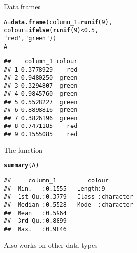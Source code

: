 \documentclass[aspectratio=169]{beamer}\usepackage[]{graphicx}\usepackage[]{xcolor}
\makeatletter
\newcommand{\hlnum}[1]{\textcolor[rgb]{0.686,0.059,0.569}{#1}}%
\newcommand{\hlsng}[1]{\textcolor[rgb]{0.192,0.494,0.8}{#1}}%
\newcommand{\hlopt}[1]{\textcolor[rgb]{0,0,0}{#1}}%
\newcommand{\hldef}[1]{\textcolor[rgb]{0.345,0.345,0.345}{#1}}%
\newcommand{\hlkwb}[1]{\textcolor[rgb]{0.69,0.353,0.396}{#1}}%
\newcommand{\hlkwc}[1]{\textcolor[rgb]{0.333,0.667,0.333}{#1}}%
\newcommand{\hlkwd}[1]{\textcolor[rgb]{0.737,0.353,0.396}{\textbf{#1}}}%
\newenvironment{kframe}{%
 \def\at@end@of@kframe{}%
 \ifinner\ifhmode%
  \def\at@end@of@kframe{\end{minipage}}%
  \begin{minipage}{\columnwidth}%
 \fi\fi%
 \def\FrameCommand##1{\hskip\@totalleftmargin \hskip-\fboxsep
 \colorbox{shadecolor}{##1}\hskip-\fboxsep
     \hskip-\linewidth \hskip-\@totalleftmargin \hskip\columnwidth}%
 \MakeFramed {\advance\hsize-\width
   \@totalleftmargin\z@ \linewidth\hsize
   \@setminipage}}%
 {\par\unskip\endMakeFramed%
 \at@end@of@kframe}
\newenvironment{knitrout}{}{} %
\makeatother
\begin{document}
\begin{frame}[fragile]{Data frames}
\begin{knitrout}
\color{fgcolor}\begin{kframe}
\begin{alltt}
\hldef{A} \hlkwb{=} \hlkwd{data.frame}\hldef{(}\hlkwc{column_1} \hldef{=} \hlkwd{runif}\hldef{(}\hlnum{9}\hldef{),}
               \hlkwc{colour} \hldef{=} \hlkwd{ifelse}\hldef{(}\hlkwd{runif}\hldef{(}\hlnum{9}\hldef{)} \hlopt{<} \hlnum{0.5}\hldef{,}
                               \hlsng{"red"}\hldef{,} \hlsng{"green"}\hldef{))}
\hldef{A}
\end{alltt}
\begin{verbatim}
##    column_1 colour
## 1 0.3778929    red
## 2 0.9480250  green
## 3 0.3294807  green
## 4 0.9845760  green
## 5 0.5528227  green
## 6 0.8898816  green
## 7 0.3826196  green
## 8 0.7471185    red
## 9 0.1555085    red
\end{verbatim}
\end{kframe}
\end{knitrout}
\end{frame}
  
\begin{frame}[fragile]{The  function}
\begin{knitrout}
\color{fgcolor}\begin{kframe}
\begin{alltt}
\hlkwd{summary}\hldef{(A)}
\end{alltt}
\begin{verbatim}
##     column_1         colour         
##  Min.   :0.1555   Length:9          
##  1st Qu.:0.3779   Class :character  
##  Median :0.5528   Mode  :character  
##  Mean   :0.5964                     
##  3rd Qu.:0.8899                     
##  Max.   :0.9846
\end{verbatim}
\end{kframe}
\end{knitrout}
\vfill
Also works on other data types
\end{frame}
\end{document}
